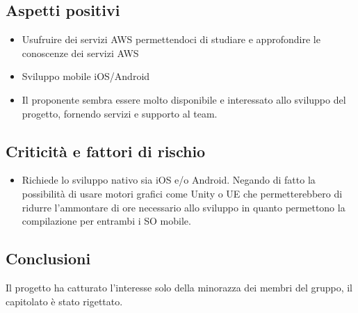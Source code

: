 \subsection{Aspetti positivi}
\begin{itemize}
    \item Usufruire dei servizi AWS permettendoci di studiare e approfondire le conoscenze dei servizi AWS
    \item Sviluppo mobile iOS/Android
    \item Il proponente sembra essere molto disponibile e interessato allo sviluppo del progetto, fornendo servizi e supporto al team.
\end{itemize}
\subsection{Criticità e fattori di rischio}
\begin{itemize}
    \item Richiede lo sviluppo nativo sia iOS e/o Android. Negando di fatto la possibilità di usare motori grafici come Unity o UE che permetterebbero di ridurre l'ammontare di ore necessario allo sviluppo in quanto permettono la compilazione per entrambi i SO mobile.
\end{itemize}
\subsection{Conclusioni}
Il progetto ha catturato l'interesse solo della minorazza dei membri del gruppo, il capitolato è stato rigettato.
